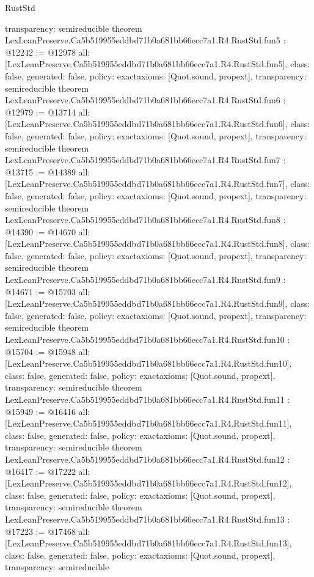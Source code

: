 \begin{lexlean}{RustStd}
\begin{coremodule}
{  transparency: semireducible
}
theorem LexLeanPreserve.Ca5b519955eddbd71b0a681bb66ecc7a1.R4.RustStd.fun5 : @12242 := @12978 {
  all: [LexLeanPreserve.Ca5b519955eddbd71b0a681bb66ecc7a1.R4.RustStd.fun5],
  class: false,
  generated: false,
  policy: exact{axioms: [Quot.sound, propext]},
  transparency: semireducible
}
theorem LexLeanPreserve.Ca5b519955eddbd71b0a681bb66ecc7a1.R4.RustStd.fun6 : @12979 := @13714 {
  all: [LexLeanPreserve.Ca5b519955eddbd71b0a681bb66ecc7a1.R4.RustStd.fun6],
  class: false,
  generated: false,
  policy: exact{axioms: [Quot.sound, propext]},
  transparency: semireducible
}
theorem LexLeanPreserve.Ca5b519955eddbd71b0a681bb66ecc7a1.R4.RustStd.fun7 : @13715 := @14389 {
  all: [LexLeanPreserve.Ca5b519955eddbd71b0a681bb66ecc7a1.R4.RustStd.fun7],
  class: false,
  generated: false,
  policy: exact{axioms: [Quot.sound, propext]},
  transparency: semireducible
}
theorem LexLeanPreserve.Ca5b519955eddbd71b0a681bb66ecc7a1.R4.RustStd.fun8 : @14390 := @14670 {
  all: [LexLeanPreserve.Ca5b519955eddbd71b0a681bb66ecc7a1.R4.RustStd.fun8],
  class: false,
  generated: false,
  policy: exact{axioms: [Quot.sound, propext]},
  transparency: semireducible
}
theorem LexLeanPreserve.Ca5b519955eddbd71b0a681bb66ecc7a1.R4.RustStd.fun9 : @14671 := @15703 {
  all: [LexLeanPreserve.Ca5b519955eddbd71b0a681bb66ecc7a1.R4.RustStd.fun9],
  class: false,
  generated: false,
  policy: exact{axioms: [Quot.sound, propext]},
  transparency: semireducible
}
theorem LexLeanPreserve.Ca5b519955eddbd71b0a681bb66ecc7a1.R4.RustStd.fun10 : @15704 := @15948 {
  all: [LexLeanPreserve.Ca5b519955eddbd71b0a681bb66ecc7a1.R4.RustStd.fun10],
  class: false,
  generated: false,
  policy: exact{axioms: [Quot.sound, propext]},
  transparency: semireducible
}
theorem LexLeanPreserve.Ca5b519955eddbd71b0a681bb66ecc7a1.R4.RustStd.fun11 : @15949 := @16416 {
  all: [LexLeanPreserve.Ca5b519955eddbd71b0a681bb66ecc7a1.R4.RustStd.fun11],
  class: false,
  generated: false,
  policy: exact{axioms: [Quot.sound, propext]},
  transparency: semireducible
}
theorem LexLeanPreserve.Ca5b519955eddbd71b0a681bb66ecc7a1.R4.RustStd.fun12 : @16417 := @17222 {
  all: [LexLeanPreserve.Ca5b519955eddbd71b0a681bb66ecc7a1.R4.RustStd.fun12],
  class: false,
  generated: false,
  policy: exact{axioms: [Quot.sound, propext]},
  transparency: semireducible
}
theorem LexLeanPreserve.Ca5b519955eddbd71b0a681bb66ecc7a1.R4.RustStd.fun13 : @17223 := @17468 {
  all: [LexLeanPreserve.Ca5b519955eddbd71b0a681bb66ecc7a1.R4.RustStd.fun13],
  class: false,
  generated: false,
  policy: exact{axioms: [Quot.sound, propext]},
  transparency: semireducible
}
\end{coremodule}
\end{lexlean}

